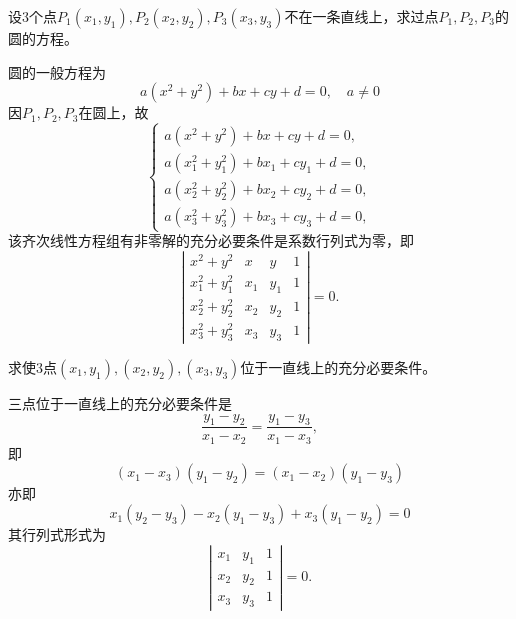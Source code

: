 \begin{frame}




\begin{testexample} 
  设3个点$P_1(x_1,y_1),P_2(x_2,y_2),P_3(x_3,y_3)$不在一条直线上，求过点$P_1,P_2,P_3$的圆的方程。
\end{testexample}

\begin{jie}
圆的一般方程为
$$
a(x^2+y^2)+bx+cy+d=0, \quad a\ne 0
$$
因$P_1,P_2,P_3$在圆上，故
$$
\left\{
\begin{array}{l}
a(x^2+y^2)+bx+cy+d=0,\\[0.1cm]
a(x_1^2+y_1^2)+bx_1+cy_1+d=0,\\[0.1cm]
a(x_2^2+y_2^2)+bx_2+cy_2+d=0,\\[0.1cm]
a(x_3^2+y_3^2)+bx_3+cy_3+d=0,      
\end{array}
\right.
$$
该齐次线性方程组有非零解的充分必要条件是系数行列式为零，即
$$
\left|
\begin{array}{cccc}
x^2+y^2 & x & y & 1\\
x_1^2+y_1^2 & x_1 & y_1 & 1\\
x_2^2+y_2^2 & x_2 & y_2 & 1\\
x_3^2+y_3^2 & x_3 & y_3 & 1
\end{array}
\right| = 0.
$$
\end{jie}




\end{frame}

\begin{frame}

\begin{testexample} 
  求使3点$(x_1,y_1), (x_2,y_2), (x_3,y_3)$位于一直线上的充分必要条件。
\end{testexample}
\begin{jie}
三点位于一直线上的充分必要条件是
$$
\frac{y_1-y_2}{x_1-x_2}=\frac{y_1-y_3}{x_1-x_3},
$$
即
$$
(x_1-x_3)(y_1-y_2)=(x_1-x_2)(y_1-y_3)
$$
亦即
$$
x_1(y_2-y_3)-x_2(y_1-y_3)+x_3(y_1-y_2)=0
$$
其行列式形式为
$$
\left|
\begin{array}{ccc}
x_1&y_1&1\\
x_2&y_2&1\\
x_3&y_3&1
\end{array}
\right|=0.
$$
\end{jie}





\end{frame}

